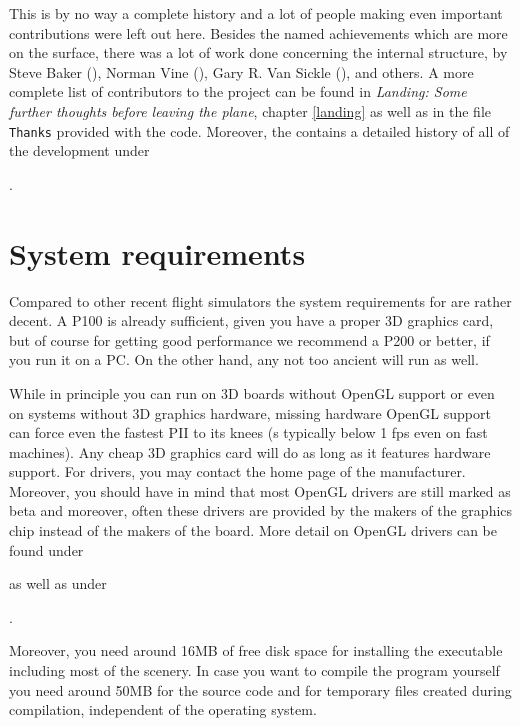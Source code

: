 This is by no way a complete history and a lot of people making even important
contributions were left out here. Besides the named achievements which are more on the
surface, there was a lot of work done concerning the internal structure, by Steve
Baker (), Norman
Vine (), Gary R. Van Sickle (), and others. A more complete list of
contributors to the project can be found in \textit{Landing: Some further thoughts before
leaving the plane}, chapter \ref{landing} as well as in the file \texttt{Thanks} provided
with the code. Moreover, the  contains a detailed history of
all of the development under

.

\section{System requirements}
Compared to other recent flight simulators the system requirements
for \FlightGear are rather decent. A P100 is already sufficient,
given you have a proper 3D graphics card, but of course for
getting good performance we recommend a P200 or better, if you run
it on a PC. On the other hand, any not too ancient 
 will run \FlightGear as well.

While in principle you can run \FlightGear on 3D boards without OpenGL support or even on
systems without 3D graphics hardware, missing hardware OpenGL support can force even the
fastest PII to its knees (s typically below 1 fps even on fast
machines). Any cheap 3D graphics card will do as long as it features hardware
 support. For  drivers, you may contact the home page
of the manufacturer. Moreover, you should have in mind that most OpenGL
drivers are still marked as beta and moreover, often these drivers
are provided by the makers of the graphics chip instead of the makers of the board. More
detail on OpenGL drivers can be found under


\noindent
  as well as under

.

Moreover, you need around 16MB of free disk space for installing the
executable including most of the scenery. In case you want to compile
the program yourself you need around 50MB for the source code and for
temporary files created during compilation, independent of the
operating system.

